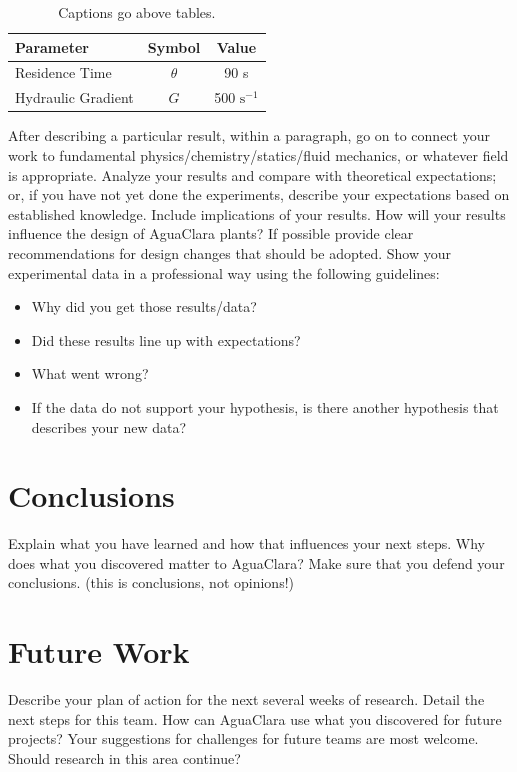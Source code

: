 \documentclass[a4paper]{article}
\begin{document}
\begin{table}[H]
\centering
\caption{Captions go above tables.}
\begin{tabular}{| l | c | c |}
\hline
Parameter & Symbol & Value \\ \hline
Residence Time & $\theta$ & 90 s \\ \hline
Hydraulic Gradient & $G$ & 500 $\mathrm{s^{-1}}$ \\
\hline
\end{tabular}
\label{Table}
\end{table}

After describing a particular result, within a paragraph, go on to connect your work to fundamental physics/chemistry/statics/fluid mechanics, or whatever field is appropriate. Analyze your results and compare with theoretical expectations; or, if you have not yet done the experiments, describe your expectations based on established knowledge. Include implications of your results. How will your results influence the design of AguaClara plants? If possible provide clear recommendations for design changes that should be adopted. Show your experimental data in a professional way using the following guidelines:
\begin{itemize}
\item Why did you get those results/data?
\item Did these results line up with expectations?
\item What went wrong?
\item If the data do not support your hypothesis, is there another hypothesis that describes your new data?
\end{itemize}

\section*{Conclusions}
Explain what you have learned and how that influences your next steps. Why does what you discovered matter to AguaClara? 
Make sure that you defend your conclusions. (this is conclusions, not opinions!) 


\section*{Future Work}
Describe your plan of action for the next several weeks of research. Detail the next steps for this team. How can AguaClara use what you discovered for future projects? Your suggestions for challenges for future teams are most welcome. Should research in this area continue?
\end{document}
